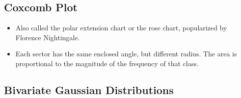 \documentclass{article}
\theoremstyle{plain}
\theoremstyle{definition}
\begin{document}
\subsection{Coxcomb Plot}
\begin{itemize}
    \item Also called the polar extension chart or the rose chart, popularized by Florence Nightingale.
    
    \item Each sector has the same enclosed angle, but different radius. The area is proportional to the magnitude of the frequency of that class.
\end{itemize}


\subsection{Bivariate Gaussian Distributions}
\end{document}
